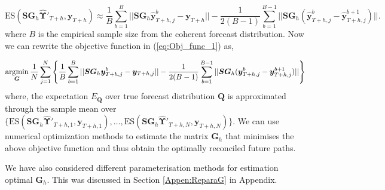 \documentclass[12pt]{article}
\def\E{\text{E}}
\theoremstyle{definition}
\begin{document}
\begin{equation}\label{eq:ES_with_Samplespaths}
\text{ES}(\bm{SG}_h\hat{\bm{\Upsilon}}'_{T+h}, \bm{y}_{T+h}) \approx \frac{1}{B}\sum_{b=1}^{B}||\bm{SG}_h\hat{\bm{y}}_{T+h,j}^b -\bm{y}_{T+h}||-\frac{1}{2(B-1)}\sum_{b=1}^{B-1}||\bm{SG}_h(\hat{\bm{y}}_{T+h,j}^b -\hat{\bm{y}}_{T+h,j}^{b+1})||.
\end{equation}
where $B$ is the empirical sample size from the coherent forecast distribution. Now we can rewrite the objective function in (\ref{eq:Obj_func_1}) as,

\begin{equation}\label{eq:Obj_func_2}
\operatornamewithlimits{argmin}_{\bm{G}} \frac{1}{N}\sum_{j=1}^{N}\left\{\frac{1}{B}\sum_{b=1}^{B}||\bm{SG}_h\bm{y}_{T+h,j}^b -\bm{y}_{T+h,j}||-\frac{1}{2(B-1)}\sum_{b=1}^{B-1}||\bm{SG}_h(\bm{y}_{T+h,j}^b -\bm{y}_{T+h,j}^{b+1})||\right\}
\end{equation}
where, the expectation $E_{\bm{Q}}$ over true forecast distribution $\bm{Q}$ is approximated through the sample mean over $\{\text{ES}(\bm{SG}_h\hat{\bm{\Upsilon}}'_{T+h,1}, \bm{y}_{T+h,1}),\dots,\text{ES}(\bm{SG}_h\hat{\bm{\Upsilon}}'_{T+h,N}, \bm{y}_{T+h,N})\}$.
We can use numerical optimization methods to estimate the matrix $\bm{G}_h$ that minimises the above objective function and thus obtain the optimally reconciled future paths.

We have also considered different parameterisation methods for estimation optimal $\bm{G}_h$. This was discussed in Section \ref{Appen:ReparaG} in Appendix. 



%
\end{document}

